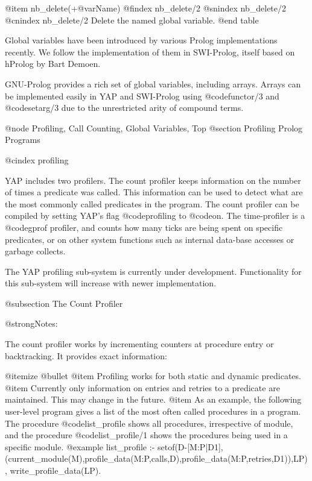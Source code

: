 {{{{{{@item nb_delete(+@var{Name}) 
@findex nb_delete/2
@snindex nb_delete/2
@cnindex nb_delete/2
Delete the named global variable. 
@end table

Global variables have been introduced by various Prolog
implementations recently. We follow the implementation of them in
SWI-Prolog, itself based on hProlog by Bart Demoen.

GNU-Prolog provides a rich set of global variables, including
arrays. Arrays can be implemented easily in YAP and SWI-Prolog using
@code{functor/3} and @code{setarg/3} due to the unrestricted arity of
compound terms.


@node Profiling, Call Counting, Global Variables, Top
@section Profiling Prolog Programs

@cindex profiling

YAP includes two profilers. The count profiler keeps information on the
number of times a predicate was called. This information can be used to
detect what are the most commonly called predicates in the program.  The
count profiler can be compiled by setting YAP's flag @code{profiling}
to @code{on}. The time-profiler is a @code{gprof} profiler, and counts
how many ticks are being spent on specific predicates, or on other
system functions such as internal data-base accesses or garbage collects.

The YAP profiling sub-system is currently under
development. Functionality for this sub-system will increase with newer
implementation.

@subsection The Count Profiler

@strong{Notes:}

The count profiler works by incrementing counters at procedure entry or
backtracking. It provides exact information:

@itemize @bullet
@item Profiling works for both static and dynamic predicates.
@item Currently only information on entries and retries to a predicate
are maintained. This may change in the future.
@item As an example, the following user-level program gives a list of
the most often called procedures in a program. The procedure
@code{list_profile} shows all procedures, irrespective of module, and
the procedure @code{list_profile/1} shows the procedures being used in
a specific module.
@example
list_profile :-
        setof(D-[M:P|D1],(current_module(M),profile_data(M:P,calls,D),profile_data(M:P,retries,D1)),LP),
        write_profile_data(LP).

}}}}}}
